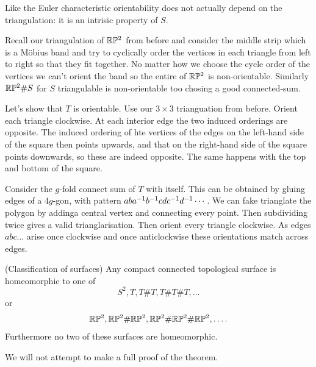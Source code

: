 \documentclass{article}
\begin{document}
\begin{remark}
  Like the Euler characteristic orientability does not actually depend on the triangulation: it is an intrisic property of $ S $.
\end{remark}
Recall our triangulation of $ \mathbb{R}\mathbb P^2 $ from before and consider the middle strip which is a M\"obius band and try to cyclically order the vertices in each triangle from left to right so that they fit together.
No matter how we choose the cycle order of the vertices we can't orient the band so the entire of $ \mathbb{R}\mathbb P^2 $ is non-orientable. Similarly $ \mathbb{R}\mathbb P^2 \# S $ for $ S $ triangulable is non-orientable too chosing a good connected-sum.
\begin{example}
  Let's show that $ T $ is orientable. Use our $ 3\times 3 $ trianguation from before. Orient each triangle clockwise. At each interior edge the two induced orderings are opposite. The induced ordering of hte vertices of the edges on the left-hand side of the square then points upwards, and that on the right-hand side of the square points downwards, so these are indeed opposite. The same happens with the top and bottom of the square.
\end{example}
\begin{example}
  Consider the $ g $-fold connect sum of $ T $ with itself. This can be obtained by gluing edges of a $ 4g $-gon, with pattern $ ab{a}^{-1} {b}^{-1} cd {c}^{-1} {d}^{-1} \cdots $. We can fake trianglate the polygon by addinga central vertex and connecting every point. Then subdividing twice gives a valid trianglarisation. Then orient every triangle clockwise. As edges $ abc\dots $ arise once clockwise and once anticlockwise these orientations match across edges.
\end{example}
\begin{theorem}
	(Classification of surfaces) Any compact connected topological surface is homeomorphic to one of
\[
  S^2, T, T\# T, T\# T\# T,\dots
\]
or
\[
  \mathbb{R}\mathbb P^2, \mathbb{R}\mathbb P^2 \# \mathbb{R}\mathbb P^2, \mathbb{R}\mathbb P^2 \# \mathbb{R}\mathbb P^2 \# \mathbb{R}\mathbb P^2,\dots.
\]
Furthermore no two of these surfaces are homeomorphic.
\end{theorem}
We will not attempt to make a full proof of the theorem.\par
\end{document}
